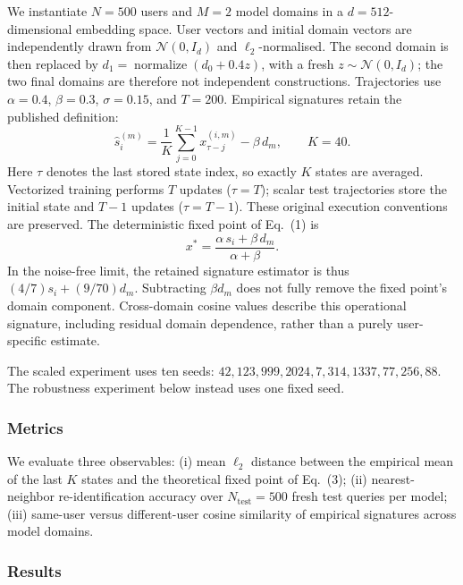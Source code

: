 \documentclass[11pt]{article}
\begin{document}
We instantiate $N=500$ users and $M=2$ model domains in a $d=512$-dimensional
embedding space. User vectors and initial domain vectors are independently drawn
from $\mathcal{N}(0,I_d)$ and $\ell_2$-normalised. The second domain is then
replaced by $d_1=\operatorname{normalize}(d_0+0.4z)$, with a fresh
$z\sim\mathcal{N}(0,I_d)$; the two final domains are therefore not independent
constructions. Trajectories use $\alpha=0.4$, $\beta=0.3$, $\sigma=0.15$,
and $T=200$. Empirical signatures retain the published definition:
\begin{equation}
  \hat{s}^{(m)}_i = \frac{1}{K}\sum_{j=0}^{K-1}x^{(i,m)}_{\tau-j}-\beta\,d_m,
  \qquad K=40.
\end{equation}
Here $\tau$ denotes the last stored state index, so exactly $K$ states are
averaged. Vectorized training performs $T$ updates ($\tau=T$); scalar test
trajectories store the initial state and $T-1$ updates ($\tau=T-1$). These
original execution conventions are preserved.
The deterministic fixed point of Eq.~(1) is
\begin{equation}
  x^{*} = \frac{\alpha\, s_i + \beta\, d_m}{\alpha + \beta}.
\end{equation}
In the noise-free limit, the retained signature estimator is thus
$(4/7)s_i+(9/70)d_m$. Subtracting $\beta d_m$ does not fully remove the
fixed point's domain component. Cross-domain cosine values describe this
operational signature, including residual domain dependence, rather than a
purely user-specific estimate.

The scaled experiment uses ten seeds:
$42,123,999,2024,7,314,1337,77,256,88$.
The robustness experiment below instead uses one fixed seed.

\subsubsection{Metrics}

We evaluate three observables: (i) mean $\ell_2$ distance between the empirical
mean of the last $K$ states and the theoretical fixed point of Eq.~(3); (ii) nearest-neighbor
re-identification accuracy over $N_{\text{test}}=500$ fresh test queries per model;
(iii) same-user versus different-user cosine similarity of empirical signatures
across model domains.

\subsubsection{Results}
\end{document}
